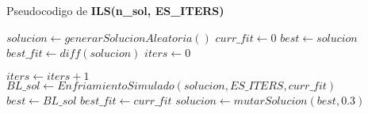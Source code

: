      Pseudocodigo de \textbf{ILS(n\_sol, ES\_ITERS)}
     \begin{algorithm}[H]
       \begin{algorithmic}[1]
          \State $solucion \gets generarSolucionAleatoria()$
          \State $curr\_fit \gets 0$
          \State $best \gets solucion$
          \State $best\_fit \gets diff(solucion)$
          \State $iters \gets 0$

            \State $ iters \gets iters + 1$
            \State $BL\_sol \gets EnfriamientoSimulado(solucion,ES\_ITERS,curr\_fit)$ 
              \State $best \gets BL\_sol$
              \State $best\_fit \gets curr\_fit$
            \EndIf
            \State $solucion \gets mutarSolucion(best,0.3)$
            \EndWhile
          \State {}
         \EndFunction
       \end{algorithmic}
     \end{algorithm}



